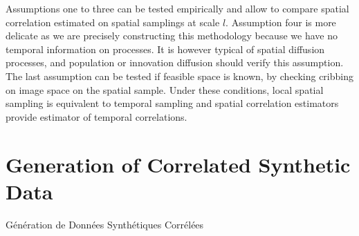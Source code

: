 Assumptions one to three can be tested empirically and allow to compare spatial correlation estimated on spatial samplings at scale $l$. Assumption four is more delicate as we are precisely constructing this methodology because we have no temporal information on processes. It is however typical of spatial diffusion processes, and population or innovation diffusion should verify this assumption. 
 The last assumption can be tested if feasible space is known, by checking cribbing on image space on the spatial sample. Under these conditions, local spatial sampling is equivalent to temporal sampling and spatial correlation estimators provide estimator of temporal correlations.










\newpage



\section{Generation of Correlated Synthetic Data}{Génération de Données Synthétiques Corrélées}




